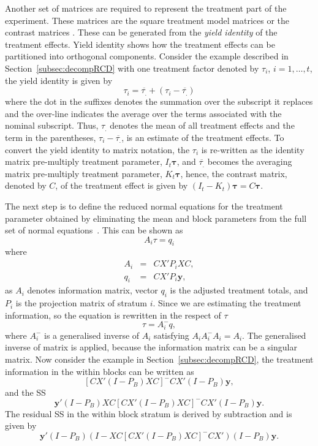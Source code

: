 \documentclass[article]{jss}
\begin{document}
Another set of matrices are required to represent the treatment part of the experiment. These matrices are the square treatment model matrices \citep{Nelder1965B} or the contrast matrices \citep{John1987}. These can be generated from the \emph{yield identity} of the treatment effects. Yield identity shows how the treatment effects can be partitioned into orthogonal components. Consider the example described in Section~\ref{subsec:decompRCD} with one treatment factor denoted by $\tau_i$, $i= 1,\dots, t$, the yield identity is given by
\[\tau_{i} = \overline{\tau_{.}}+(\tau_{i} -\overline{\tau_{.}})\]
where the dot in the suffixes denotes the summation over the subscript it replaces and the over-line indicates the average over the terms associated with the nominal subscript. Thus, $\tau_{.}$ denotes the mean of all treatment effects and the term in the parentheses, $\tau_{i} -\overline{\tau_{.}}$, is an estimate of the treatment effects. To convert the yield identity to matrix notation, the $\tau_{i}$ is re-written as the identity matrix pre-multiply treatment parameter, $I_t\bm{\tau}$, and $\overline{\tau_{.}}$ becomes the averaging matrix pre-multiply treatment parameter, $K_t\bm{\tau}$, hence, the contrast matrix, denoted by $C$, of the treatment effect is given by $(I_t - K_t)\bm{\tau} = C\bm{\tau}$.

The next step is to define the reduced normal equations for the treatment parameter obtained by eliminating the mean and block parameters from the full set of normal equations~\citep{John1987}. This can be shown as
\begin{equation*}
A_i\tau = q_i
\end{equation*}
where
\begin{eqnarray*}
A_i &=& CX' P_i XC,\\
q_i &=& CX' P_i \bm{y},
\end{eqnarray*}
as $A_i$ denotes information matrix, vector $q_i$ is the adjusted treatment totals, and $P_i$ is the projection matrix of stratum $i$. Since we are estimating the treatment information, so the equation is rewritten in the respect of $\tau$
\begin{equation*}
\tau = A_{i}^{-} q,
\end{equation*}
where $A_{i}^{-}$ is a generalised inverse of $A_{i}$ satisfying $A_{i} A_{i}^{-} A_{i} = A_{i}$. The generalised inverse of matrix is applied, because the information matrix can be a singular matrix. Now consider the example in Section~\ref{subsec:decompRCD}, the treatment information in the within blocks can be written as 
\[ [CX' (I - P_B) XC]^{-}CX'(I - P_B)\bm{y},\]
and the SS
\begin{equation}\label{eq:genInvTrt}
\bm{y}'(I - P_B)XC[CX' (I - P_B) XC]^{-}CX'(I - P_B)\bm{y}.
\end{equation}
The residual SS in the within block stratum is derived by subtraction and is given by
\[ \bm{y}'(I - P_B)(I - XC[CX' (I - P_B) XC]^{-}CX')(I - P_B)\bm{y}. \]
\end{document}
